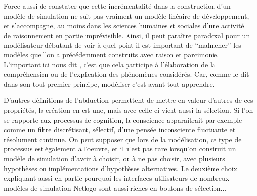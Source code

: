 Force aussi de constater que cette incrémentalité dans la construction d'un modèle de simulation ne suit pas vraiment un modèle linéaire de développement, et s'accompagne, au moins dans les sciences humaines et sociales d'une activité de raisonnement en partie imprévisible. Ainsi, il peut paraître paradoxal pour un modélisateur débutant de voir à quel point il est important de \enquote{malmener} les modèles que l'on a précédemment construits avec raison et parcimonie. L'important ici nous dit \textcite{Amblard2010}, c'est que cela participe à l'élaboration de la compréhension ou de l'explication des phénomènes considérés. Car, comme le dit \textcite[65]{Banos2013} dans son tout premier principe, modéliser c'est avant tout apprendre.

D'autres définitions de l'abduction  permettent de mettre en valeur d'autres de ces propriétés, la création en est une, mais avec celle-ci vient aussi la sélection. Si l'on se rapporte aux processus de cognition, la conscience apparaitrait par exemple comme un filtre discrétisant, sélectif, d'une pensée inconsciente fluctuante et résolument continue. On peut supposer que lors de la modélisation, ce type de processus est également à l'oeuvre, et il n'est pas rare lorsqu'on construit un modèle de simulation d'avoir à choisir, ou à ne pas choisir, avec plusieurs hypothèses ou implémentations d'hypothèses alternatives. Le deuxième choix expliquant aussi en partie pourquoi les interfaces utilisateurs de nombreux modèles de simulation Netlogo sont aussi riches en boutons de sélection...



